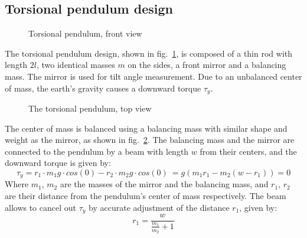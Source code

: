 \documentclass[\main/master.tex]{subfiles}
\begin{document}
\subsection{Torsional pendulum design}
\begin{figure}[htbp]
	\centering
	\caption[Torsional pendulum, front view]{Torsional pendulum, front view}
	\label{fig:pendulum front}
\end{figure}
\FloatBarrier
\par\noindent
The torsional pendulum design, shown in fig.~\ref{fig:pendulum front}, is composed of a thin rod with length $2l$, two identical masses $m$ on the sides, a front mirror and a balancing mass. The mirror is used for tilt angle measurement. Due to an unbalanced center of mass, the earth's gravity causes a downward torque $\tau_y$. 
\begin{figure}[htbp]
	\centering
	\caption[The torsional pendulum, top view]{The torsional pendulum, top view}
	\label{fig:pendulum top}
\end{figure}
\FloatBarrier 
\par\noindent
The center of mass is balanced using a balancing mass with similar shape and weight as the mirror, as shown in fig.~\ref{fig:pendulum top}. The balancing mass and the mirror are connected to the pendulum by a beam with length $w$ from their centers, and the downward torque is given by:
\begin{equation}
\tau_y = r_1\cdot m_1 g \cdot cos(0) - r_2\cdot m_2 g \cdot cos (0)\ = g( m_1 r_1  - m_2 (w-r_1) )  =0    \label{eqn:downward torque}
\end{equation}
Where $m_1$, $m_2$ are the masses of the mirror and the balancing mass, and $r_1$, $r_2$ are their distance from the pendulum's center of mass respectively. The beam allows to cancel out $\tau_y$ by accurate adjustment of the distance $r_1$, given by: 
\begin{equation}
 r_1 = \frac{w}{\frac{m_1}{m_2}+1}  \label{eqn:downward torque cancelled}
\end{equation}
\end{document}
